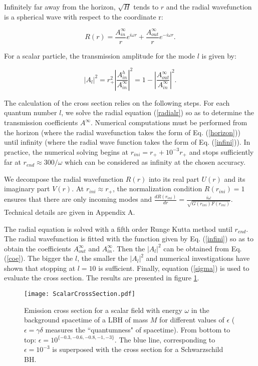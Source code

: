 \documentclass[twocolumn,amsmath,amssymb,prl,10pt,nofootinbib,superscriptaddress]{revtex4}
\def\be{\begin{equation}}
\def\ee{\end{equation}}
\begin{document}
Infinitely far away from the horizon, $\sqrt{H}$ tends to $r$ and the radial wavefunction is a spherical wave with respect to the coordinate r:

\be
R(r)= \frac{A^{\infty}_{in}}{r}e^{i \omega r}+\frac{A^{\infty}_{out}}{r}e^{-i \omega r}.
\label{infini}
\ee

For a scalar particle, the transmission amplitude for the mode $l$ is given by:

\be
|A_l |^2=r_+^{2} \left| \frac{A^{h}_{in}}{A^{\infty}_{in}} \right| ^2 = 1-\left| \frac{A^{\infty}_{out}}{A^{\infty}_{in}} \right| ^2.
\label{coe}
\ee



The calculation of the cross section relies on the following steps. For each quantum number $l$, we solve the radial equation (\ref{radialr}) so as to determine the transmission coefficients $A^{\infty}$. Numerical computations must be performed from the horizon (where the radial wavefunction takes the form of Eq. (\ref{horizon})) until infinity (where the radial wave function takes the form of Eq. (\ref{infini})). In practice, the numerical solving begins at $r_{ini}= r_+ + 10^{-3}r_+ $ and stops sufficiently far at $r_{end}  \approx 300/ \omega$ which can be considered as infinity at the chosen accuracy. 

We decompose the radial wavefunction $R(r)$ into its real part $U(r)$ and its imaginary part $V(r)$. At $r_{ini} \approx r_+ $, the normalization condition $R(r_{ini})=1$ ensures that there are only incoming modes and $\frac{d R(r_{ini})}{dr}=\frac{i \omega}{\sqrt{G(r_{ini}) F(r_{ini})}} $. Technical details are given in Appendix A. 

The radial equation is solved with a fifth order Runge Kutta method until $r_{end}$. The  radial wavefunction is fitted with the function given by Eq. (\ref{infini}) so as to obtain the coefficients $A^{\infty}_{out}$ and $A^{\infty}_{in}$. Then the $|A_l |^2$ can be obtained from Eq. (\ref{coe}). The bigger the $l$, the smaller the $|A_l |^2$ and numerical investigations have shown that stopping at  $l=10 $ is sufficient. Finally, equation (\ref{sigma}) is used to evaluate the cross section. The results are presented in figure \ref{CSection}. \\

\begin{figure}
\centering
    \texttt{[image: ScalarCrossSection.pdf]}  
 \caption{Emission cross section for a scalar field with energy $\omega$ in the background spacetime of a LBH of mass $M$ for different values of $\epsilon$ ($\epsilon=\gamma\delta$ measures the ``quantumness" of spacetime). From bottom to top: $\epsilon=10^{ \{-0.3,-0.6,-0.8,-1,-3\}}$. The blue line, corresponding to $\epsilon=10^{-3}$ is superposed with the cross section for a Schwarzschild BH.}
      \label{CSection}

\end{figure}
\end{document}
